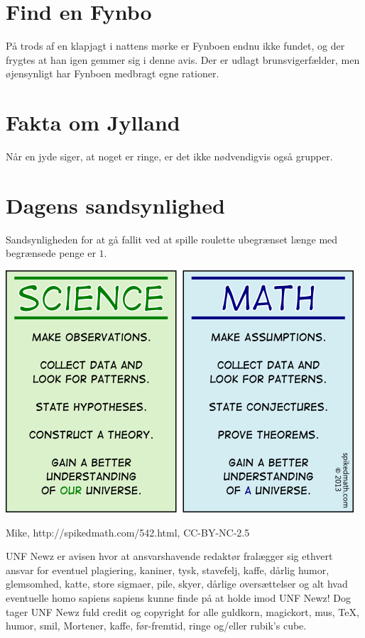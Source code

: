 \begin{minipage}[b]{0.95\linewidth}
\begin{minipage}[t]{0.47\textwidth}
\section*{Find en Fynbo}
På trods af en klapjagt i nattens mørke er Fynboen endnu ikke fundet, og der frygtes at han igen gemmer sig i denne avis. Der er udlagt brunsvigerfælder, men øjensynligt har Fynboen medbragt egne rationer.

\section*{Fakta om Jylland}
Når en jyde siger, at noget er ringe, er det ikke nødvendigvis også grupper.

\section*{Dagens sandsynlighed}
Sandsynligheden for at gå fallit ved at spille roulette ubegrænset længe med begrænsede penge er $1$.

\vspace{3mm}
\end{minipage}

\includegraphics[width=\textwidth]{542-science-vs-math.png}
\begin{center}
\tiny Mike, http://spikedmath.com/542.html, CC-BY-NC-2.5

\vspace{3mm}

\tiny UNF Newz er avisen hvor at ansvarshavende redaktør fralægger sig ethvert ansvar for eventuel plagiering, kaniner, tysk, stavefelj, kaffe, dårlig humor, glemsomhed, katte, store sigmaer, pile, skyer, dårlige oversættelser og alt hvad eventuelle homo sapiens sapiens kunne finde på at holde imod UNF Newz! Dog tager UNF Newz fuld credit og copyright for alle guldkorn, magickort, mus, \TeX, humor, smil, Mortener, kaffe, før-fremtid, ringe og/eller rubik's cube.
\end{center}
\end{minipage}


